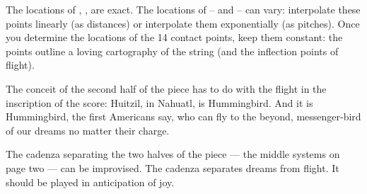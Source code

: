 The locations of 
,
,
are exact.
The locations of
 --
and 
 --
can vary:
interpolate these points linearly (as distances) or interpolate them
exponentially (as pitches). Once you determine the locations of the 14 contact
points, keep them constant: the points outline a loving cartography of the
string (and the inflection points of flight).

The conceit of the second half of the piece has to do with the flight in the
inscription of the score: Huitzil, in Nahuatl, is Hummingbird. And it is
Hummingbird, the first Americans say, who can fly to the beyond, messenger-bird
of our dreams no matter their charge.

The cadenza separating the two halves of the piece --- the middle systems on
page two --- can be improvised. The cadenza separates dreams from flight. It
should be played in anticipation of joy.
